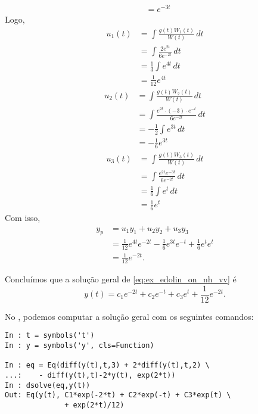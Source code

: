 \begin{ex}
\begin{align}
           &= e^{-3t}
  \end{align}
  Logo,
  \begin{align}
    u_1(t) &= \int \frac{g(t)W_1(t)}{W(t)}\,dt \\
           &= \int \frac{2e^{2t}}{6e^{-2t}}\,dt \\
           &= \frac{1}{3}\int e^{4t}\,dt \\
           &= \frac{1}{12}e^{4t}
  \end{align}
  \begin{align}
    u_2(t) &= \int \frac{g(t)W_2(t)}{W(t)}\,dt \\
           &= \int \frac{e^{2t}\cdot (-3)\cdot e^{-t}}{6e^{-2t}}\,dt \\
           &= -\frac{1}{2}\int e^{3t}\,dt \\
           &= -\frac{1}{6}e^{3t}
  \end{align}
  \begin{align}
    u_3(t) &= \int \frac{g(t)W_3(t)}{W(t)}\,dt \\
           &= \int \frac{e^{2t}e^{-3t}}{6e^{-2t}}\,dt \\
           &= \frac{1}{6}\int e^{t}\,dt \\
           &= \frac{1}{6}e^{t}
  \end{align}
  Com isso,
  \begin{align}
    y_p &= u_1y_1 + u_2y_2 + u_3y_3 \\
        &= \frac{1}{12}e^{4t}e^{-2t} - \frac{1}{6}e^{3t}e^{-t}+\frac{1}{6}e^te^t \\
        &= \frac{1}{12}e^{-2t}.
  \end{align}

  Concluímos que a solução geral de \eqref{eq:ex_edolin_on_nh_vv} é
  \begin{equation}
    y(t) = c_1e^{-2t}+c_2e^{-t}+c_3e^t+\frac{1}{12}e^{-2t}.
  \end{equation}

  \ifispython
  No \python, podemos computar a solução geral com os seguintes comandos:
\begin{verbatim}
In : t = symbols('t')
In : y = symbols('y', cls=Function)

In : eq = Eq(diff(y(t),t,3) + 2*diff(y(t),t,2) \
...:    - diff(y(t),t)-2*y(t), exp(2*t))
In : dsolve(eq,y(t))
Out: Eq(y(t), C1*exp(-2*t) + C2*exp(-t) + C3*exp(t) \
              + exp(2*t)/12)
\end{verbatim}
  \fi
\end{ex}


